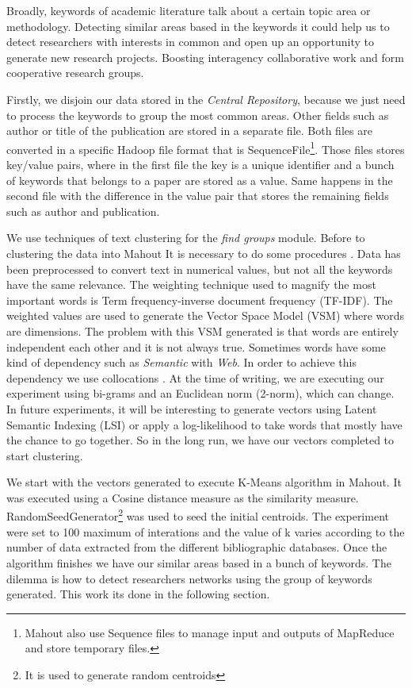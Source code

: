 \documentclass[11pt]{article}
\begin{document}
Broadly, keywords of academic literature talk about a certain topic area or methodology. Detecting similar areas based in the keywords it could help us to detect researchers with interests in common and open up an opportunity to generate new research projects. Boosting interagency collaborative work and form cooperative research groups.

Firstly, we disjoin our data stored in the \emph{Central Repository}, because we just need to process the keywords to group the most common areas. Other fields such as author or title of the publication are stored in a separate file. Both files are converted in a specific Hadoop file format that is SequenceFile\footnote{Mahout also use Sequence files to manage input and outputs of MapReduce and store temporary files.}. Those files stores key/value pairs, where in the first file the key is a unique identifier and a bunch of keywords that belongs to a paper are stored as a value. Same happens in the second file with the difference in the value pair that stores the remaining fields such as author and publication. 

We use techniques of text clustering \cite{Andrews} for the \emph{find groups} module. Before to clustering the data into Mahout It is necessary to do some procedures . Data has been preprocessed to convert text in numerical values, but not all the keywords have the same relevance. The weighting technique used to magnify the most important words is Term frequency-inverse document frequency (TF-IDF). The weighted values are used to generate the Vector Space Model (VSM) where words are dimensions. The problem with this VSM generated is that words are entirely independent each other and it is not always true. Sometimes words have some kind of dependency such as \emph{Semantic} with \emph{Web}. In order to achieve this dependency we use collocations \cite{Manning}. At the time of writing, we are executing our experiment using bi-grams and an Euclidean norm (2-norm), which can change. In future experiments, it will be interesting to generate vectors using Latent Semantic Indexing (LSI) or apply a log-likelihood to take words that mostly have the chance to go together. So in the long run, we have our vectors completed to start clustering.

We start with the vectors generated to execute K-Means algorithm in Mahout. It was executed using a Cosine distance measure as the similarity measure. RandomSeedGenerator\footnote{It is used to generate random centroids} was used to seed the initial centroids. The experiment were set to 100 maximum of interations and the value of k varies according to the number of data extracted from the different bibliographic databases. Once the algorithm finishes we have our similar areas based in a bunch of keywords. The dilemma is how to detect researchers networks using the group of keywords generated. This work its done in the following section.
\end{document}
